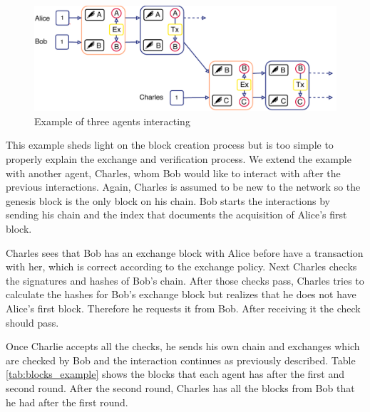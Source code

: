 \begin{figure}
    \centering
    \includegraphics[width=\textwidth]{images/trustchain_example.pdf}
    \caption{Example of three agents interacting}
    \label{fig:exchange_example}
\end{figure}

This example sheds light on the block creation process but is too simple to properly explain the 
exchange and verification process. We extend the example with another agent, Charles, whom Bob would
like to interact with after the previous interactions. Again, Charles is assumed to be new to the 
network so the genesis block is the only block on his chain. Bob starts the interactions by sending
his chain and the index that documents the acquisition of Alice's first block. 

Charles sees that Bob has an exchange block with Alice before have a transaction with her, which is 
correct according to the exchange policy. Next Charles checks the signatures and hashes of Bob's chain. 
After those checks pass, Charles tries to calculate the hashes for Bob's exchange block but realizes
that he does not have Alice's first block. Therefore he requests it from Bob. After receiving it the
check should pass. 

Once Charlie accepts all the checks, he sends his own chain and exchanges which are checked by Bob
and the interaction continues as previously described. Table \ref{tab:blocks_example} shows the
blocks that each agent has after the first and second round. After the second round, Charles has 
all the blocks from Bob that he had after the first round.


